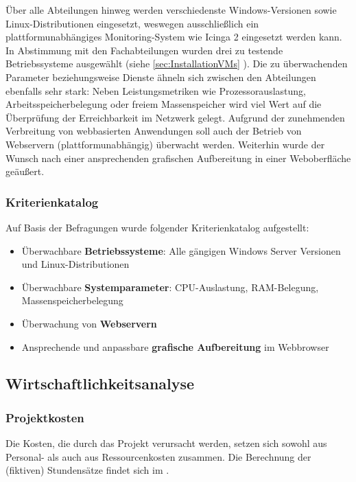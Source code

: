 Über alle Abteilungen hinweg werden verschiedenste Windows-Versionen sowie Linux-Distributionen eingesetzt, weswegen ausschließlich ein plattformunabhängiges Monitoring-System wie \glqq Icinga 2\grqq{} eingesetzt werden kann. In Abstimmung mit den Fachabteilungen wurden drei zu testende Betriebssysteme ausgewählt (siehe \ref{sec:InstallationVMs} ). Die zu überwachenden Parameter beziehungsweise Dienste ähneln sich zwischen den Abteilungen ebenfalls sehr stark: Neben Leistungsmetriken wie Prozessorauslastung, Arbeitsspeicherbelegung oder freiem Massenspeicher wird viel Wert auf die Überprüfung der Erreichbarkeit im Netzwerk gelegt. Aufgrund der zunehmenden Verbreitung von webbasierten Anwendungen soll auch der Betrieb von Webservern (plattformunabhängig) überwacht werden. Weiterhin wurde der Wunsch nach einer ansprechenden grafischen Aufbereitung in einer Weboberfläche geäußert.

\subsubsection{Kriterienkatalog}
\label{sec:Kriterienkatalog}
Auf Basis der Befragungen wurde folgender Kriterienkatalog aufgestellt:
\begin{itemize}
	\item Überwachbare \textbf{Betriebssysteme}: Alle gängigen Windows Server Versionen und Linux-Distributionen
	\item Überwachbare \textbf{Systemparameter}: CPU-Auslastung, RAM-Belegung, Massenspeicherbelegung
	\item Überwachung von \textbf{Webservern}
	\item Ansprechende und anpassbare \textbf{grafische Aufbereitung} im Webbrowser
\end{itemize}

\subsection{Wirtschaftlichkeitsanalyse}
\label{sec:Wirtschaftlichkeitsanalyse}

\subsubsection{Projektkosten}
\label{sec:Projektkosten}
Die Kosten, die durch das Projekt verursacht werden, setzen sich sowohl aus Personal- als auch aus Ressourcenkosten zusammen. Die Berechnung der (fiktiven) Stundensätze findet sich im .

